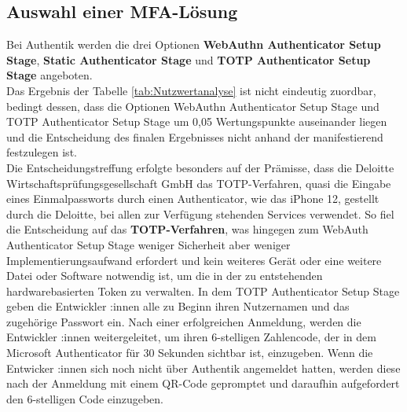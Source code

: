 \subsection{Auswahl einer MFA-Lösung}
\label{sec:Auswahl einer MFA-Lösung}
Bei Authentik werden die drei Optionen \textbf{WebAuthn Authenticator Setup Stage}, \textbf{Static Authenticator Stage} und 
\textbf{\acs{TOTP} Authenticator Setup Stage} angeboten. 
\\Das Ergebnis der Tabelle \ref*{tab:Nutzwertanalyse}  ist nicht eindeutig zuordbar, bedingt dessen, dass 
die Optionen WebAuthn Authenticator Setup Stage und \acs{TOTP} Authenticator Setup Stage um 0,05 Wertungspunkte auseinander liegen und 
die Entscheidung des finalen Ergebnisses nicht anhand der  manifestierend festzulegen ist.
\\Die Entscheidungstreffung erfolgte besonders auf der Prämisse, dass die Deloitte Wirtschaftsprüfungsgesellschaft GmbH das \acs{TOTP}-Verfahren, 
quasi die Eingabe eines Einmalpassworts durch einen Authenticator, wie das iPhone 12, gestellt durch die Deloitte, bei allen zur Verfügung 
stehenden Services verwendet. So fiel die Entscheidung auf das \textbf{\acs{TOTP}-Verfahren}, was hingegen zum WebAuth Authenticator 
Setup Stage weniger Sicherheit aber weniger Implementierungsaufwand erfordert und kein weiteres Gerät oder eine weitere Datei oder Software 
notwendig ist, um die in der zu entstehenden hardwarebasierten Token zu verwalten. In dem \acs{TOTP} Authenticator Setup Stage geben die 
Entwickler :innen alle zu Beginn ihren Nutzernamen und das zugehörige Passwort ein. Nach einer erfolgreichen Anmeldung, werden die 
Entwickler :innen weitergeleitet, um ihren 6-stelligen Zahlencode, der in dem Microsoft Authenticator für 30 Sekunden sichtbar ist, einzugeben. 
Wenn die Entwicker :innen sich noch nicht über Authentik angemeldet hatten, werden diese nach der Anmeldung mit einem QR-Code gepromptet und 
daraufhin aufgefordert den 6-stelligen Code einzugeben.


